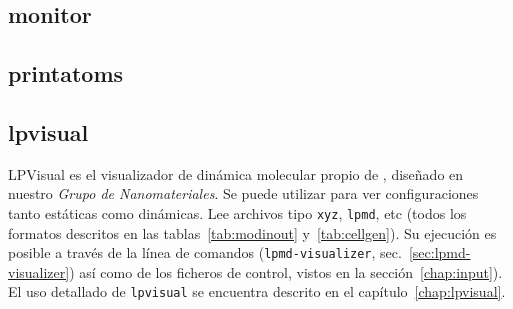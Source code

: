 \subsection {monitor}

\subsection {printatoms}

\subsection{lpvisual}

LPVisual es el visualizador de din\'amica molecular propio de {\lpmd},
dise\~nado en nuestro \emph{Grupo de Nanomateriales}. Se puede utilizar para ver
configuraciones tanto est\'aticas como din\'amicas. Lee archivos tipo {\tt xyz},
{\tt lpmd}, etc (todos los formatos descritos en las tablas~\ref{tab:modinout}
y~\ref{tab:cellgen}). Su ejecuci\'on es posible a trav\'es de la l\'inea de
comandos ({\tt lpmd-visualizer}, sec.~\ref{sec:lpmd-visualizer}) as\'i como de
los ficheros de control, vistos en la secci\'on~\ref{chap:input}). El uso
detallado de {\tt lpvisual} se encuentra descrito en el
cap\'itulo~\ref{chap:lpvisual}.


